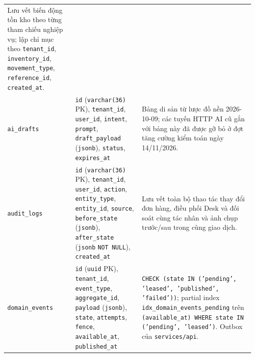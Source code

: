 \begin{table}[htbp]
\begin{tabularx}{\linewidth}{@{}
    >{\raggedright\arraybackslash}p{3.1cm}
    >{\raggedright\arraybackslash}p{5.5cm}
    >{\raggedright\arraybackslash}X@{}}
    Lưu vết biến động tồn kho theo từng tham chiếu nghiệp vụ; lập chỉ mục theo \texttt{tenant\_id}, \texttt{inventory\_id}, \texttt{movement\_type}, \texttt{reference\_id}, \texttt{created\_at}. \\
    \texttt{ai\_drafts} &
    \texttt{id} (\texttt{varchar(36)} PK), \texttt{tenant\_id}, \texttt{user\_id}, \texttt{intent}, \texttt{prompt}, \texttt{draft\_payload} (\texttt{jsonb}), \texttt{status}, \texttt{expires\_at} &
    Bảng di sản từ lược đồ nền 2026-10-09; các tuyến HTTP AI cũ gắn với bảng này đã được gỡ bỏ ở đợt tăng cường kiểm toán ngày 14/11/2026. \\
    \texttt{audit\_logs} &
    \texttt{id} (\texttt{varchar(36)} PK), \texttt{tenant\_id}, \texttt{user\_id}, \texttt{action}, \texttt{entity\_type}, \texttt{entity\_id}, \texttt{source}, \texttt{before\_state} (\texttt{jsonb}), \texttt{after\_state} (\texttt{jsonb} \texttt{NOT NULL}), \texttt{created\_at} &
    Lưu vết toàn bộ thao tác thay đổi đơn hàng, điều phối Desk và đối soát cùng tác nhân và ảnh chụp trước/sau trong cùng giao dịch. \\
    \texttt{domain\_\hspace{0pt}events} &
    \texttt{id} (\texttt{uuid} PK), \texttt{tenant\_id}, \texttt{event\_type}, \texttt{aggregate\_id}, \texttt{payload} (\texttt{jsonb}), \texttt{state}, \texttt{attempts}, \texttt{fence}, \texttt{available\_at}, \texttt{published\_at} &
    \texttt{CHECK (state IN ('pending', 'leased', 'published', 'failed'))}; partial index \texttt{idx\_\hspace{0pt}domain\_\hspace{0pt}events\_\hspace{0pt}pending} trên \texttt{(available\_at) WHERE state IN ('pending', 'leased')}. Outbox của \texttt{services/\hspace{0pt}api}. \\
    \bottomrule
  \end{tabularx}
\end{table}

